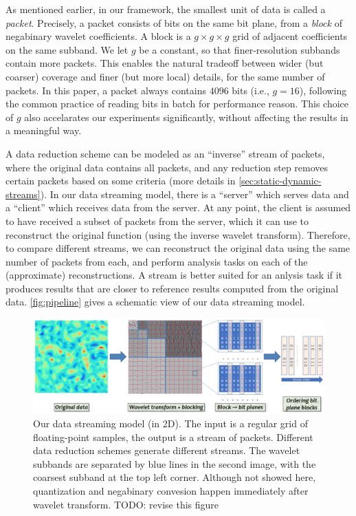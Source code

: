 As mentioned earlier, in our framework, the smallest unit of data is called a \emph{packet}.
Precisely, a packet consists of bits on the same bit plane, from a \emph{block} of negabinary
wavelet coefficients. A block is a $g\times g\times g$ grid of adjacent coefficients on the same
subband. We let $g$ be a constant, so that finer-resolution subbands contain more packets. This
enables the natural tradeoff between wider (but coarser) coverage and finer (but more local)
details, for the same number of packets. In this paper, a packet always contains $4096$ bits (i.e.,
$g=16$), following the common practice of reading bits in batch for performance reason. This choice
of $g$ also accelarates our experiments significantly, without affecting the results in a meaningful
way.

A data reduction scheme can be modeled as an ``inverse'' stream of packets, where the original data
contains all packets, and any reduction step removes certain packets based on some criteria (more
details in \autoref{sec:static-dynamic-streams}). In our data streaming model, there is a ``server''
which serves data and a ``client'' which receives data from the server. At any point, the client is
assumed to have received a subset of packets from the server, which it can use to reconstruct the
original function (using the inverse wavelet transform). Therefore, to compare different streams, we
can reconstruct the original data using the same number of packets from each, and perform analysis
tasks on each of the (approximate) reconstructions. A stream is better suited for an anlysis task if
it produces results that are closer to reference results computed from the original data.
\autoref{fig:pipeline} gives a schematic view of our data streaming model.

\begin{figure}[h]
  \centering
  \includegraphics[width=\linewidth]{img/pipeline.png}
  \caption{Our data streaming model (in 2D). The input is a regular grid of floating-point samples,
  the output is a stream of packets. Different data reduction schemes generate different streams.
  The wavelet subbands are separated by blue lines in the second image, with the coarsest subband at
  the top left corner. Although not showed here, quantization and negabinary convesion happen
  immediately after wavelet transform. TODO: revise this figure}\label{fig:pipeline}
\end{figure}

